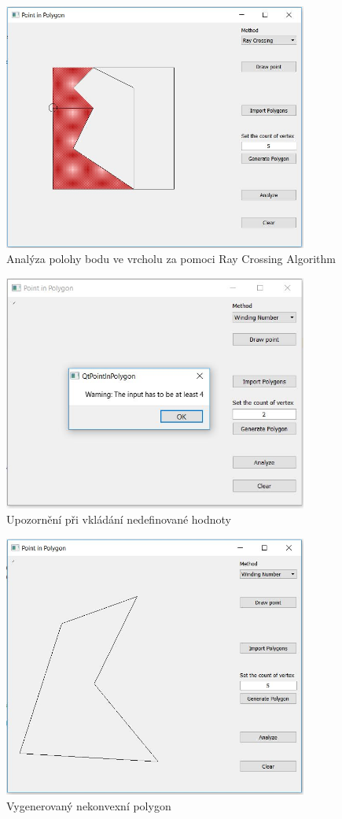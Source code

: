 \documentclass[a4paper, 12pt]{article}
\begin{document}
\begin{figure}[h!]
	\centering
	\includegraphics[width=10cm]{ray_vertex.jpg}
	\caption{Analýza polohy bodu ve vrcholu za pomoci Ray Crossing Algorithm}
\end{figure}

\begin{figure}[h!]
	\centering
	\includegraphics[width=10cm]{warning.jpg}
	\caption{Upozornění při vkládání nedefinované hodnoty}
\end{figure}

\begin{figure}[h!]
	\centering
	\includegraphics[width=10cm]{non_convex.jpg}
	\caption{Vygenerovaný nekonvexní polygon}
\end{figure}
\end{document}
